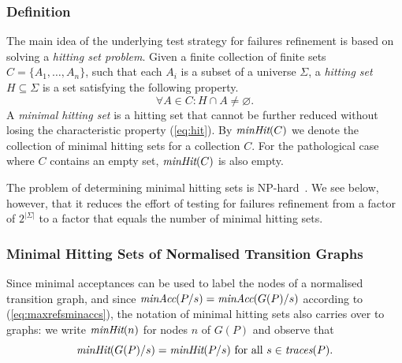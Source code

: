 \subsubsection*{Definition}
The main idea of the underlying test strategy for failures refinement is
based on solving a \emph{hitting set problem}. Given a finite collection of
finite sets $C = \{ A_1,\dots,A_n\}$, such that each $A_i$ is a subset of a
universe $\Sigma$, a \emph{hitting set} $H\subseteq\Sigma$ is a set
satisfying the following property.
%
\begin{equation}
  \label{eq:hit}
  \forall A\in C: H\cap A \neq\varnothing.
\end{equation}
%
A \emph{minimal hitting set} is a hitting set that cannot be further reduced
without losing the characteristic property (\ref{eq:hit}). By $\text{\it minHit}(C)$
we denote the collection of minimal hitting sets for a collection $C$. For
the pathological case where $C$ contains an empty set, $\text{\it minHit}(C)$ is also
empty.

The problem of determining minimal hitting sets is %
NP-hard~\cite{5533149}. We see below, however, that it reduces the effort of
testing for failures refinement from a factor of $2^{|\Sigma|}$ to a factor
that equals the number of minimal hitting sets.



\subsubsection*{Minimal Hitting Sets of Normalised Transition Graphs}
Since minimal acceptances can be used to label the nodes of a normalised transition graph, and since $\text{\it minAcc}(P/s) = \text{\it minAcc}(G(P)/s)$ according to (\ref{eq:maxrefsminaccs}), the notation of minimal hitting sets also
carries over to graphs: we write $\text{\it minHit}(n)$ for nodes $n$ of $G(P)$ and observe that
\begin{equation}
\label{eq:minhitsGP}
\text{\it minHit}(G(P)/s) = \text{\it minHit}(P/s) \ \text{for all}\ s\in \text{\it traces}(P).
\end{equation}


